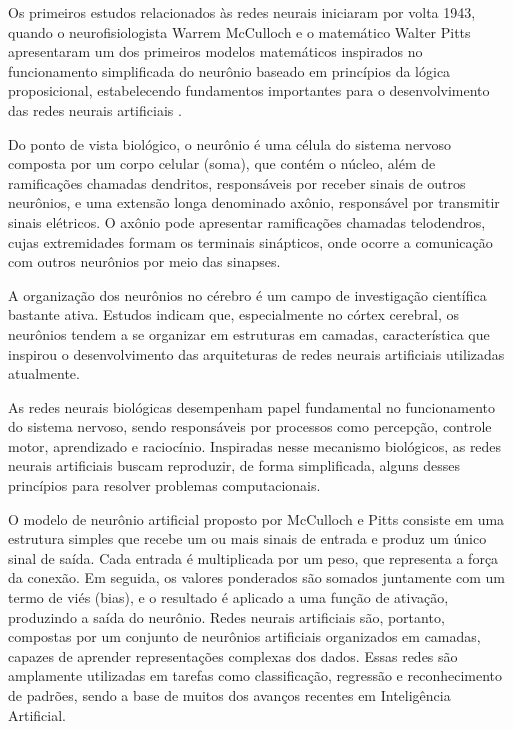 Os primeiros estudos relacionados às redes neurais iniciaram por volta 1943,
quando o neurofisiologista Warrem McCulloch e o matemático Walter Pitts \cite{palm1986warren} apresentaram
um dos primeiros modelos matemáticos inspirados no funcionamento simplificada do neurônio
baseado em princípios da lógica proposicional, estabelecendo fundamentos importantes para o
desenvolvimento das redes neurais artificiais \cite{yang2016propositional}. 

Do ponto de vista biológico, o neurônio é
uma célula do sistema nervoso composta por um corpo celular (soma), que contém o núcleo,
além de ramificações chamadas dendritos, responsáveis por receber sinais de outros neurônios,
e uma extensão longa denominado axônio, responsável por transmitir sinais elétricos. O axônio
pode apresentar ramificações chamadas telodendros, cujas extremidades formam os terminais
sinápticos, onde ocorre a comunicação com outros neurônios por meio das sinapses.

A organização dos neurônios no cérebro é um campo de investigação científica bastante ativa.
Estudos indicam que, especialmente no córtex cerebral, os neurônios tendem a se organizar em
estruturas em camadas, característica que inspirou o desenvolvimento das arquiteturas de redes
neurais artificiais utilizadas atualmente. 

As redes neurais biológicas desempenham papel
fundamental no funcionamento do sistema nervoso, sendo responsáveis por processos como
percepção, controle motor, aprendizado e raciocínio. Inspiradas nesse mecanismo biológicos,
as redes neurais artificiais buscam reproduzir, de forma simplificada, alguns desses princípios
para resolver problemas computacionais.

O modelo de neurônio artificial proposto por
McCulloch e Pitts consiste em uma estrutura simples que recebe um ou mais sinais de entrada e produz um único sinal de saída. Cada entrada é multiplicada por um peso, que representa a
força da conexão. Em seguida, os valores ponderados são somados juntamente com um termo
de viés (bias), e o resultado é aplicado a uma função de ativação, produzindo a saída do
neurônio. Redes neurais artificiais são, portanto, compostas por um conjunto de neurônios
artificiais organizados em camadas, capazes de aprender representações complexas dos dados.
Essas redes são amplamente utilizadas em tarefas como classificação, regressão e
reconhecimento de padrões, sendo a base de muitos dos avanços recentes em Inteligência
Artificial.

